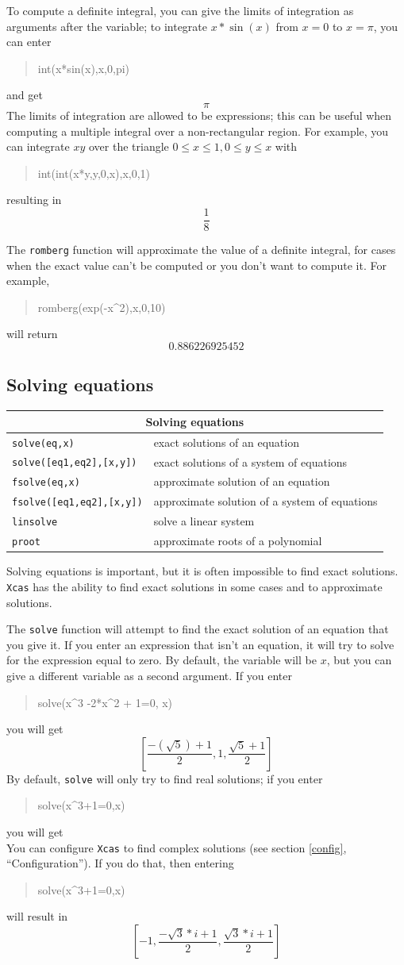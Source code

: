 \documentclass{article}
\newcommand{\xcasin}[1]
{\begin{quote}\ttfamily
#1
\end{quote}}
\newcommand{\xcasout}[1]
{\begin{equation*}
#1
\end{equation*}}
\begin{document}
To compute a definite integral, you can give the limits of integration
as arguments after the variable; to integrate $x*\sin(x)$ from $x=0$ to
$x=\pi$, you can enter
\xcasin{int(x*sin(x),x,0,pi)}
and get
\xcasout{\pi}
The limits of integration are allowed to be expressions; this can be
useful when computing a multiple integral over a non-rectangular
region.  For example, you can integrate $x y$ over the triangle $0 \le
x \le 1, 0 \le y \le x$ with
\xcasin{int(int(x*y,y,0,x),x,0,1)}
resulting in
\xcasout{\frac{1}{8}}

The \texttt{romberg} function will approximate the value of a definite
integral, for cases when the exact value can't be computed or you
don't want to compute it.  For example,
\xcasin{romberg(exp(-x\^{}2),x,0,10)}
will return
\xcasout{0.886226925452}


\subsection{Solving equations}
\label{solve}

\begin{center}
\begin{tabular}{|p{}|p{}|}
\hline
\multicolumn{2}{|c|}{\bf Solving equations}\\
\hline\hline
\texttt{solve(eq,x)} & exact solutions of an  equation\\
\texttt{solve([eq1,eq2],[x,y])} & exact solutions of a system of equations\\
\texttt{fsolve(eq,x)} & approximate solution of an equation\\
\texttt{fsolve([eq1,eq2],[x,y])} & approximate solution of a system of equations\\
\texttt{linsolve} & solve a linear system\\
\texttt{proot} & approximate roots of a polynomial\\
\hline
\end{tabular}
\end{center}

Solving equations is important, but it is often impossible to find
exact solutions.  \texttt{Xcas} has the ability to find exact
solutions in some cases and to approximate solutions.

The \texttt{solve} function will attempt to find the exact solution of
an equation that you give it.  If you enter an expression that isn't
an equation, it will try to solve for the expression equal to zero.
By default, the variable will be $x$, but you can give a different
variable as a second argument.  If you enter 
\xcasin{solve(x\^{}3 -2*x\^{}2 + 1=0, x)}
you will get
\xcasout{\left[\frac{-(\sqrt{5})+1}{2},1,\frac{\sqrt{5}+1}{2}\right]}
By default, \texttt{solve} will only try to find real solutions; if
you enter
\xcasin{solve(x\^{}3+1=0,x)}
you will get
\xcasout{[-1]}
You can configure \texttt{Xcas} to find complex solutions (see
section \ref{config}, ``Configuration'').  If you do that,
then entering
\xcasin{solve(x\^{}3+1=0,x)}
will result in
\xcasout{\left[-1,\frac{-\sqrt{3}*i+1}{2},\frac{\sqrt{3}*i+1}{2}\right]}
\end{document}
